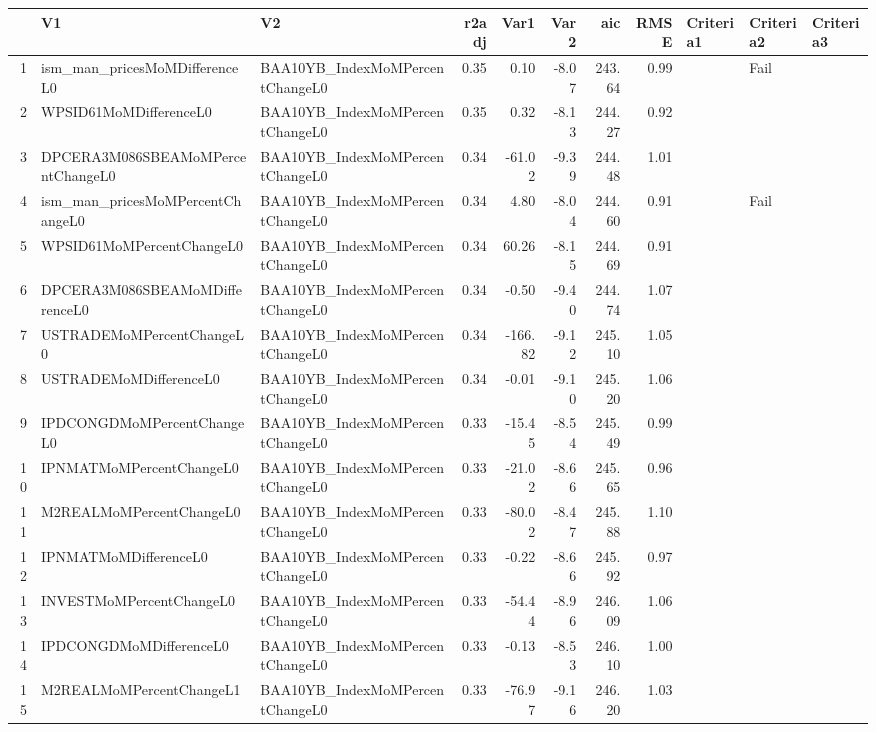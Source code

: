 \begin{longtable}{rllrrrrrlll}
  \hline
 & V1 & V2 & r2adj & Var1 & Var2 & aic & RMSE & Criteria1 & Criteria2 & Criteria3 \\ 
  \hline
1 & ism\_man\_pricesMoMDifferenceL0 & BAA10YB\_IndexMoMPercentChangeL0 & 0.35 & 0.10 & -8.07 & 243.64 & 0.99 &  & Fail &  \\ 
  2 & WPSID61MoMDifferenceL0 & BAA10YB\_IndexMoMPercentChangeL0 & 0.35 & 0.32 & -8.13 & 244.27 & 0.92 &  &  &  \\ 
  3 & DPCERA3M086SBEAMoMPercentChangeL0 & BAA10YB\_IndexMoMPercentChangeL0 & 0.34 & -61.02 & -9.39 & 244.48 & 1.01 &  &  &  \\ 
  4 & ism\_man\_pricesMoMPercentChangeL0 & BAA10YB\_IndexMoMPercentChangeL0 & 0.34 & 4.80 & -8.04 & 244.60 & 0.91 &  & Fail &  \\ 
  5 & WPSID61MoMPercentChangeL0 & BAA10YB\_IndexMoMPercentChangeL0 & 0.34 & 60.26 & -8.15 & 244.69 & 0.91 &  &  &  \\ 
  6 & DPCERA3M086SBEAMoMDifferenceL0 & BAA10YB\_IndexMoMPercentChangeL0 & 0.34 & -0.50 & -9.40 & 244.74 & 1.07 &  &  &  \\ 
  7 & USTRADEMoMPercentChangeL0 & BAA10YB\_IndexMoMPercentChangeL0 & 0.34 & -166.82 & -9.12 & 245.10 & 1.05 &  &  &  \\ 
  8 & USTRADEMoMDifferenceL0 & BAA10YB\_IndexMoMPercentChangeL0 & 0.34 & -0.01 & -9.10 & 245.20 & 1.06 &  &  &  \\ 
  9 & IPDCONGDMoMPercentChangeL0 & BAA10YB\_IndexMoMPercentChangeL0 & 0.33 & -15.45 & -8.54 & 245.49 & 0.99 &  &  &  \\ 
  10 & IPNMATMoMPercentChangeL0 & BAA10YB\_IndexMoMPercentChangeL0 & 0.33 & -21.02 & -8.66 & 245.65 & 0.96 &  &  &  \\ 
  11 & M2REALMoMPercentChangeL0 & BAA10YB\_IndexMoMPercentChangeL0 & 0.33 & -80.02 & -8.47 & 245.88 & 1.10 &  &  &  \\ 
  12 & IPNMATMoMDifferenceL0 & BAA10YB\_IndexMoMPercentChangeL0 & 0.33 & -0.22 & -8.66 & 245.92 & 0.97 &  &  &  \\ 
  13 & INVESTMoMPercentChangeL0 & BAA10YB\_IndexMoMPercentChangeL0 & 0.33 & -54.44 & -8.96 & 246.09 & 1.06 &  &  &  \\ 
  14 & IPDCONGDMoMDifferenceL0 & BAA10YB\_IndexMoMPercentChangeL0 & 0.33 & -0.13 & -8.53 & 246.10 & 1.00 &  &  &  \\ 
  15 & M2REALMoMPercentChangeL1 & BAA10YB\_IndexMoMPercentChangeL0 & 0.33 & -76.97 & -9.16 & 246.20 & 1.03 &  &  &  \\ 

\end{longtable}

